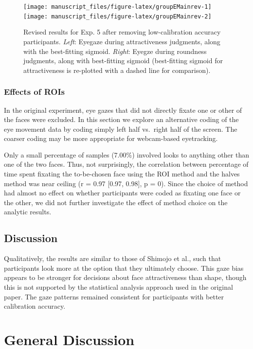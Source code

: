 \documentclass[
  man,floatsintext]{apa6}
\begin{document}
\begin{figure}
\texttt{[image: manuscript\_files/figure-latex/groupEMainrev-1]} \texttt{[image: manuscript\_files/figure-latex/groupEMainrev-2]} \caption{Revised results for Exp. 5 after removing low-calibration accuracy participants. \emph{Left}: Eyegaze during attractiveness judgments, along with the best-fitting sigmoid. \emph{Right}: Eyegze during roundness judgments, along with best-fitting sigmoid (best-fitting sigmoid for attractiveness is re-plotted with a dashed line for comparison).}\label{fig:groupEMainrev}
\end{figure}

\subsubsection{Effects of ROIs}\label{effects-of-rois-2}

In the original experiment, eye gazes that did not directly fixate one or other of the faces were excluded. In this section we explore an alternative coding of the eye movement data by coding simply left half vs.~right half of the screen. The coarser coding may be more appropriate for webcam-based eyetracking.

Only a small percentage of samples (7.00\%) involved looks to anything other than one of the two faces. Thus, not surprisingly, the correlation between percentage of time spent fixating the to-be-chosen face using the ROI method and the halves method was near ceiling (r = 0.97 {[}0.97, 0.98{]}, p = 0). Since the choice of method had almost no effect on whether participants were coded as fixating one face or the other, we did not further investigate the effect of method choice on the analytic results.

\subsection{Discussion}\label{discussion-4}

Qualitatively, the results are similar to those of Shimojo et al., such that participants look more at the option that they ultimately choose. This gaze bias appears to be stronger for decisions about face attractiveness than shape, though this is not supported by the statistical analysis approach used in the original paper. The gaze patterns remained consistent for participants with better calibration accuracy.

\section{General Discussion}\label{general-discussion}
\end{document}

